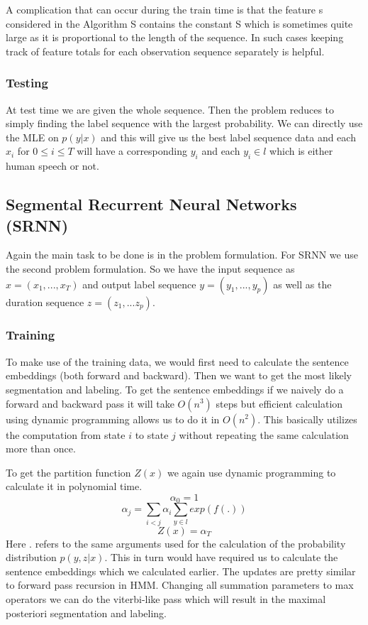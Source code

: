 \documentclass[letterpaper]{article} %
\begin{document}
A complication that can occur during the train time is that the feature s considered in the Algorithm S contains the constant S which is sometimes quite large as it is proportional to the length of the sequence. In such cases keeping track of feature totals for each observation sequence separately is helpful.

\subsubsection{Testing} At test time we are given the whole sequence. Then the problem reduces to simply finding the label sequence with the largest probability. We can directly use the MLE on $p(y|x)$ and this will give us the best label sequence data and each $x_i$ for $0 \le i \le T$ will have a corresponding $y_i$ and each $y_i \in l$ which is either human speech or not.
\subsection{Segmental Recurrent Neural Networks (SRNN)}
Again the main task to be done is in the problem formulation. For SRNN we use the second problem formulation. So we have the input sequence as $x = (x_1, ..., x_T)$ and output label sequence $y = (y_1, ... , y_p)$ as well as the duration sequence $z = (z_1, ... z_p)$.

\subsubsection{Training} To make use of the training data, we would first need to calculate the sentence embeddings (both forward and backward). Then we want to get the most likely segmentation and labeling. To get the sentence embeddings if we naively do a forward and backward pass it will take $O(n^3)$ steps but efficient calculation using dynamic programming allows us to do it in $O(n^2)$. This basically utilizes the computation from state $i$ to state $j$ without repeating the same calculation more than once.

To get the partition function $Z(x)$ we again use dynamic programming to calculate it in polynomial time.
$$\alpha_0 = 1$$ $$\alpha_j = \sum_{i < j} \alpha_i \sum_{y \in l} exp(f(.))$$ $$Z(x) = \alpha_T$$ Here $.$ refers to the same arguments used for the calculation of the probability distribution $p(y,z|x)$. This in turn would have required us to calculate the sentence embeddings which we calculated earlier.
The updates are pretty similar to forward pass recursion in HMM. Changing all summation parameters to max operators we can do the viterbi-like pass which will result in the maximal posteriori segmentation and labeling.
\end{document}
